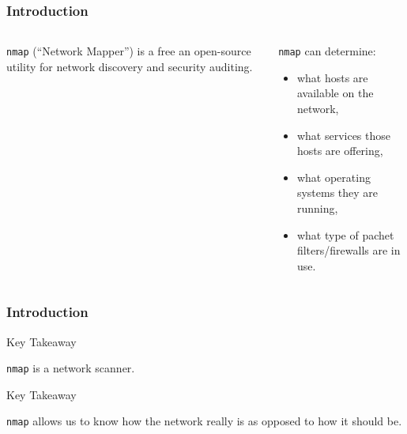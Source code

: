 \documentclass[aspectratio=169,xcolor=dvipsnames]{beamer}
\begin{document}
\begin{frame}
    \frametitle{Introduction}

    \begin{columns}
        \begin{column}{0.5\textwidth}

            \texttt{nmap} (``Network Mapper'') is a free an open-source utility for network discovery and security auditing.

        \end{column}

        \pause

        \begin{column}{0.5\textwidth}
    
            \texttt{nmap} can determine:

            \begin{itemize}
                \item what hosts are available on the network,
                \item what services those hosts are offering,
                \item what operating systems they are running,
                \item what type of pachet filters/firewalls are in use.
            \end{itemize}

        \end{column}
    \end{columns}

\end{frame}

\begin{frame}
    \frametitle{Introduction}

    \begin{exampleblock}{Key Takeaway}
        \begin{center}
            \texttt{nmap} is a network scanner.
        \end{center}
    \end{exampleblock}

    \pause

    \begin{exampleblock}{Key Takeaway}
        \begin{center}
            \texttt{nmap} allows us to know how the network really is as opposed to how it should be.
        \end{center}
    \end{exampleblock}

\end{frame}
\end{document}
